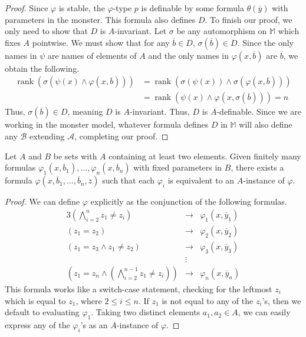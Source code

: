 \documentclass{article}
\newcommand\monster{\mathbb{M}}
\DeclareMathOperator{\rank}{rank}
\let\mc\mathcal
\begin{document}
\begin{proof}
    Since $\varphi$ is stable, the $\varphi$-type $p$ is definable by some formula $\theta(\overline{y})$ with parameters in the monster. This formula also defines $D$. To finish our proof, we only need to show that $D$ is $A$-invariant. Let $\sigma$ be any automorphism on $\monster$ which fixes $A$ pointwise. We must show that for any $\overline{b} \in D$, $\sigma(\overline{b}) \in D$. Since the only names in $\psi$ are names of elements of $A$ and the only names in $\varphi(x, \overline{b})$ are $\overline{b}$, we obtain the following.
    \begin{align*}
        \rank(\sigma(\psi(x) \land \varphi(x, \overline{b}))) &=
        \rank(\sigma(\psi(x)) \land \sigma(\varphi(x, \overline{b}))) \\ &=
        \rank(\psi(x) \land \varphi(x, \sigma(\overline{b}))) = n
    \end{align*}
    Thus, $\sigma(\overline{b}) \in D$, meaning $D$ is $A$-invariant. Thus, $D$ is $A$-definable. Since we are working in the monster model, whatever formula defines $D$ in $\monster$ will also define any $\mc{B}$ extending $\mc{A}$, completing our proof.
\end{proof}

\begin{proposition}\label{code}
    Let $A$ and $B$ be sets with $A$ containing at least two elements. Given finitely many formulas $\varphi_1(x, \overline{b}_1), \ldots, \varphi_n(x, \overline{b}_n)$ with fixed parameters in $B$, there exists a formula $\varphi(x, \overline{b}_1, \ldots, \overline{b}_n, \overline{z})$ such that each $\varphi_i$ is equivalent to an $A$-instance of $\varphi$.
\end{proposition}
\begin{proof}
    We can define $\varphi$ explicitly as the conjunction of the following formulas.
    \begin{alignat*}{3}
        \left( \bigwedge_{i=2}^{n} z_1 \neq z_i \right) &\rightarrow& \varphi_1(x, \overline{y}_1) \\
        (z_1 = z_2) &\rightarrow& \varphi_2(x, \overline{y}_2) \\
        (z_1 = z_3 \land z_1 \neq z_2) &\rightarrow& \varphi_3(x, \overline{y}_3) \\
        & \vdots & \\
        \left( z_1 = z_n \land \left( \bigwedge_{i=2}^{n-1} z_1 \neq z_i \right) \right) &\rightarrow& \varphi_n(x, \overline{y}_n)
    \end{alignat*}
    This formula works like a switch-case statement, checking for the leftmost $z_i$ which is equal to $z_1$, where $2 \leq i \leq n$. If $z_1$ is not equal to any of the $z_i$'s, then we default to evaluating $\varphi_1$. Taking two distinct elements $a_1, a_2 \in A$, we can easily express any of the $\varphi_i$'s as an $A$-instance of $\varphi$.
\end{proof}
\end{document}
